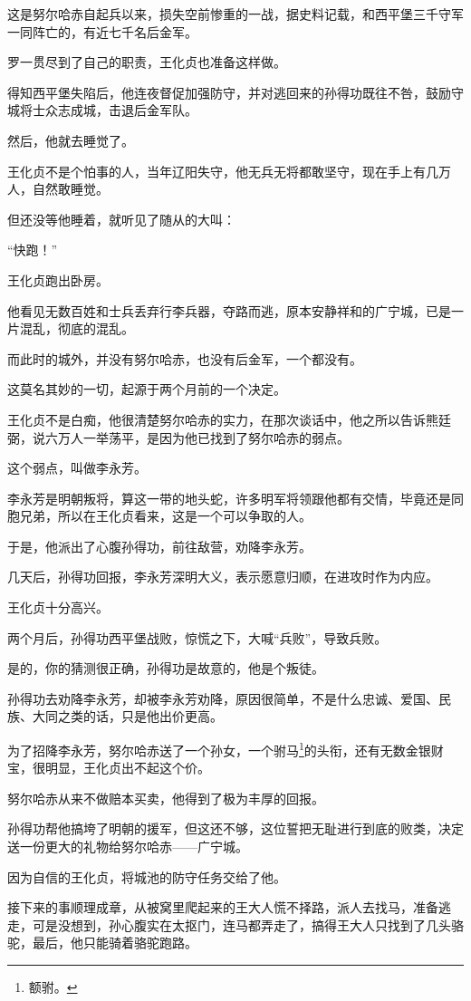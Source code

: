 \begin{multicols}{\theparacolNo}
		这是努尔哈赤自起兵以来，损失空前惨重的一战，据史料记载，和西平堡三千守军一同阵亡的，有近七千名后金军。

		罗一贯尽到了自己的职责，王化贞也准备这样做。

		得知西平堡失陷后，他连夜督促加强防守，并对逃回来的孙得功既往不咎，鼓励守城将士众志成城，击退后金军队。

		然后，他就去睡觉了。

		王化贞不是个怕事的人，当年辽阳失守，他无兵无将都敢坚守，现在手上有几万人，自然敢睡觉。

		但还没等他睡着，就听见了随从的大叫：

		“快跑！”

		王化贞跑出卧房。

		他看见无数百姓和士兵丢弃行李兵器，夺路而逃，原本安静祥和的广宁城，已是一片混乱，彻底的混乱。

		而此时的城外，并没有努尔哈赤，也没有后金军，一个都没有。

		这莫名其妙的一切，起源于两个月前的一个决定。

		王化贞不是白痴，他很清楚努尔哈赤的实力，在那次谈话中，他之所以告诉熊廷弼，说六万人一举荡平，是因为他已找到了努尔哈赤的弱点。

		这个弱点，叫做李永芳。

		李永芳是明朝叛将，算这一带的地头蛇，许多明军将领跟他都有交情，毕竟还是同胞兄弟，所以在王化贞看来，这是一个可以争取的人。

		于是，他派出了心腹孙得功，前往敌营，劝降李永芳。

		几天后，孙得功回报，李永芳深明大义，表示愿意归顺，在进攻时作为内应。

		王化贞十分高兴。

		两个月后，孙得功西平堡战败，惊慌之下，大喊“兵败”，导致兵败。

		是的，你的猜测很正确，孙得功是故意的，他是个叛徒。

		孙得功去劝降李永芳，却被李永芳劝降，原因很简单，不是什么忠诚、爱国、民族、大同之类的话，只是他出价更高。

		为了招降李永芳，努尔哈赤送了一个孙女，一个驸马\footnote{额驸。}的头衔，还有无数金银财宝，很明显，王化贞出不起这个价。

		努尔哈赤从来不做赔本买卖，他得到了极为丰厚的回报。

		孙得功帮他搞垮了明朝的援军，但这还不够，这位誓把无耻进行到底的败类，决定送一份更大的礼物给努尔哈赤——广宁城。

		因为自信的王化贞，将城池的防守任务交给了他。

		接下来的事顺理成章，从被窝里爬起来的王大人慌不择路，派人去找马，准备逃走，可是没想到，孙心腹实在太抠门，连马都弄走了，搞得王大人只找到了几头骆驼，最后，他只能骑着骆驼跑路。


\end{multicols}
